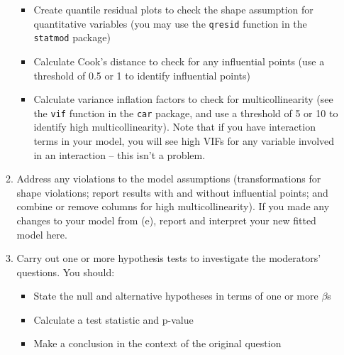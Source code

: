 \documentclass[11pt]{article}
\begin{document}
\begin{enumerate}
\begin{enumerate}
\begin{itemize}
\item Create quantile residual plots to check the shape assumption for quantitative variables (you may use the \texttt{qresid} function in the \texttt{statmod} package)
\item Calculate Cook's distance to check for any influential points (use a threshold of 0.5 or 1 to identify influential points)
\item Calculate variance inflation factors to check for multicollinearity (see the \texttt{vif} function in the \texttt{car} package, and use a threshold of 5 or 10 to identify high multicollinearity). Note that if you have interaction terms in your model, you will see high VIFs for any variable involved in an interaction -- this isn't a problem.
\end{itemize}
\item Address any violations to the model assumptions (transformations for shape violations; report results with and without influential points; and combine or remove columns for high multicollinearity). If you made any changes to your model from (e), report and interpret your new fitted model here.
\item Carry out one or more hypothesis tests to investigate the moderators' questions. You should:
\begin{itemize}
\item State the null and alternative hypotheses in terms of one or more $\beta$s
\item Calculate a test statistic and p-value
\item Make a conclusion in the context of the original question
\end{itemize}
\end{enumerate} 
\end{enumerate}
\end{document}
